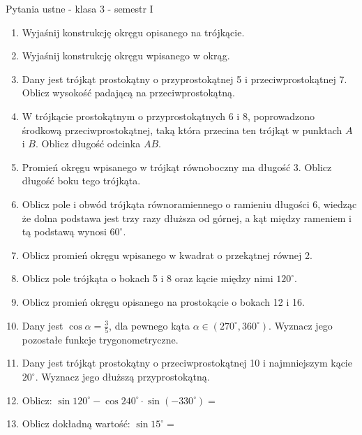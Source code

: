 \documentclass[12pt,a4paper]{article}
\begin{document}
	\begin{center}
		\LARGE Pytania ustne - klasa 3 - semestr I
	\end{center}
	\vspace{1.5cm}
	\begin{enumerate}[1.]

	\item Wyjaśnij konstrukcję okręgu opisanego na trójkącie.
	
	\item Wyjaśnij konstrukcję okręgu wpisanego w okrąg.
	
	\item Dany jest trójkąt prostokątny o przyprostokątnej 5 i przeciwprostokątnej 7. Oblicz wysokość padającą na przeciwprostokątną.

	\item W trójkącie prostokątnym o przyprostokątnych 6 i 8, poprowadzono środkową przeciwprostokątnej, taką która przecina ten trójkąt w punktach $A$ i $B$. Oblicz długość odcinka $AB$.
	
	\item Promień okręgu wpisanego w trójkąt równoboczny ma długość 3. Oblicz długość boku tego trójkąta.
	
	\item Oblicz pole i obwód trójkąta równoramiennego o ramieniu długości 6, wiedząc że dolna podstawa jest trzy razy dłuższa od górnej, a kąt między rameniem i tą podstawą wynosi $60^\circ$.
	
	\item Oblicz promień okręgu wpisanego w kwadrat o przekątnej równej 2.
	
	\item Oblicz pole trójkąta o bokach 5 i 8 oraz kącie między nimi $120^\circ$.
	
	\item Oblicz promień okręgu opisanego na prostokącie o bokach 12 i 16.
	
	\item Dany jest $\cos \alpha = \frac{3}{5}$, dla pewnego kąta $\alpha \in (270^\circ,360^\circ)$. Wyznacz jego pozostałe funkcje trygonometryczne.
	
	\item Dany jest trójkąt prostokątny o przeciwprostokątnej 10 i najmniejszym kącie $20^\circ$. Wyznacz jego dłuższą przyprostokątną.
	
	\item Oblicz:
	$\sin120^\circ - \cos240^\circ \cdot \sin(-330^\circ)=$
	
	\item Oblicz dokładną wartość: 
	$\sin 15^\circ=$
	

\end{enumerate}
\end{document}
